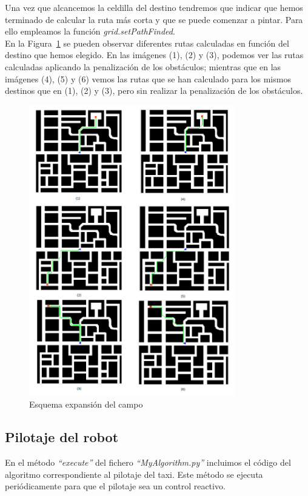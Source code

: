 Una vez que alcancemos la celdilla del destino tendremos que indicar que hemos terminado de calcular la ruta más corta y que se puede comenzar a pintar. Para ello empleamos la función \textit{grid.setPathFinded}.\\

En la Figura~\ref{fig.rutas_gpp} se pueden observar diferentes rutas calculadas en función del destino que hemos elegido. En las imágenes (1), (2) y (3), podemos ver las rutas calculadas aplicando la penalización de los obstáculos; mientras que en las imágenes (4), (5) y (6) vemos las rutas que se han calculado para los mismos destinos que en (1), (2) y (3), pero sin realizar la penalización de los obstáculos.\\

\begin{figure}[H]
  \begin{center}
    \includegraphics[width=0.8\textwidth]{figures/GPP/rutas.png}
		\caption{Esquema expansión del campo}
		\label{fig.rutas_gpp}
		\end{center}
\end{figure}

\subsection{Pilotaje del robot}\label{sec.pilotaje}
En el método \textit{``execute''} del fichero \textit{``MyAlgorithm.py''} incluimos el código del algoritmo correspondiente al pilotaje del taxi. Este método se ejecuta periódicamente para que el pilotaje sea un control reactivo.\\

